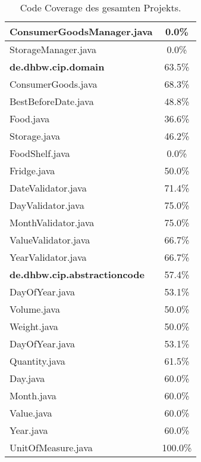 \begin{table}[ht]
\begin{tabular}{|l|c|}
        \hline
        ConsumerGoodsManager.java & 0.0\% \\
        \hline
        StorageManager.java & 0.0\% \\
        \hline
        \textbf{de.dhbw.cip.domain} & 63.5\% \\
        \hline
        ConsumerGoods.java & 68.3\% \\
        \hline
        BestBeforeDate.java & 48.8\% \\
        \hline
        Food.java & 36.6\% \\
        \hline
        Storage.java & 46.2\% \\
        \hline
        FoodShelf.java & 0.0\% \\
        \hline
        Fridge.java & 50.0\% \\
        \hline
        DateValidator.java & 71.4\% \\
        \hline
        DayValidator.java & 75.0\% \\
        \hline
        MonthValidator.java & 75.0\% \\
        \hline
        ValueValidator.java & 66.7\% \\
        \hline
        YearValidator.java & 66.7\% \\
        \hline
        \textbf{de.dhbw.cip.abstractioncode} & 57.4\% \\
        \hline
        DayOfYear.java & 53.1\% \\
        \hline
        Volume.java & 50.0\% \\
        \hline
        Weight.java & 50.0\% \\
        \hline
        DayOfYear.java & 53.1\% \\
        \hline
        Quantity.java & 61.5\% \\
        \hline
        Day.java & 60.0\% \\
        \hline
        Month.java & 60.0\% \\
        \hline
        Value.java & 60.0\% \\
        \hline
        Year.java & 60.0\% \\
        \hline
        UnitOfMeasure.java & 100.0\% \\
        \hline
    \end{tabular}
    \caption{Code Coverage des gesamten Projekts.}
    \label{tab:code-coverage-full}
\end{table}
